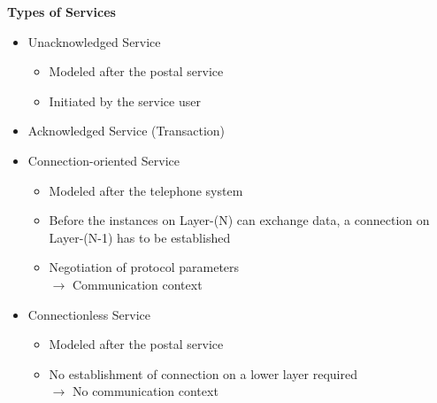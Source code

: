 \documentclass[11pt,ngerman]{article}
\begin{document}
\textbf{Types of Services}
\begin{itemize}
\item Unacknowledged	Service
\begin{itemize}
\item Modeled	after	the	postal	service
\item Initiated	by	the	service	user
\end{itemize}
\item Acknowledged	Service (Transaction)
\item Connection-oriented	Service
\begin{itemize}
\item Modeled	after	the	telephone	system
\item Before	the	instances	on	Layer-(N)	can	
exchange	data,	a	connection	on	
Layer-(N-1)	has	to	be	established
\item Negotiation	of	protocol	parameters\\
$\rightarrow$ Communication	context
\end{itemize}
\item Connectionless	Service
\begin{itemize}
\item  Modeled	after	the	postal	service
\item No	establishment	of	connection	on	a	
lower	layer	required\\
$\rightarrow$ No	communication	context
\end{itemize}
\end{itemize}
\end{document}
